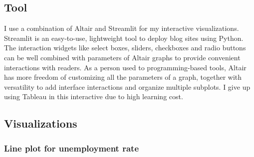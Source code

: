 \documentclass{article}
\begin{document}
\subsection*{Tool}

I use a combination of Altair and Streamlit for my interactive visualizations. Streamlit is an easy-to-use, lightweight tool to deploy blog sites using Python. The interaction widgets like select boxes, sliders, checkboxes and radio buttons can be well combined with parameters of Altair graphs to provide convenient interactions with readers. As a person used to programming-based tools, Altair has more freedom of customizing all the parameters of a graph, together with versatility to add interface interactions and organize multiple subplots. I give up using Tableau in this interactive due to high learning cost.

\subsection*{Visualizations}

\subsubsection*{Line plot for unemployment rate}
\end{document}
